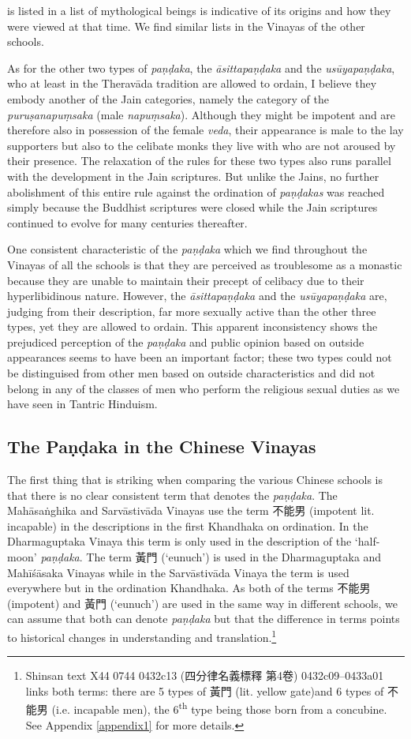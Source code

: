 is listed in a list of mythological beings is indicative of its origins and how they were viewed at that time. We find similar lists in the Vinayas of the other schools.

As for the other two types of {\em paṇḍaka}, the {\em āsittapaṇḍaka} and the {\em usūyapaṇḍaka}, who at least in the Theravāda tradition are allowed to ordain, I believe they embody another of the Jain categories, namely the category of the {\em puruṣanapuṃsaka} (male {\em napuṃsaka}). Although they might be impotent and are therefore also in possession of the female {\em veda}, their appearance is male to the lay supporters but also to the celibate monks they live with who are not aroused by their presence. The relaxation of the rules for these two types also runs parallel with the development in the Jain scriptures. But unlike the Jains, no further abolishment of this entire rule against the ordination of {\em paṇḍakas} was reached simply because the Buddhist scriptures were closed while the Jain scriptures continued to evolve for many centuries thereafter.

One consistent characteristic of the {\em paṇḍaka} which we find throughout the Vinayas of all the schools is that they are perceived as troublesome as a monastic because they are unable to maintain their precept of celibacy due to their hyperlibidinous nature. However, the {\em āsittapaṇḍaka} and the {\em usūyapaṇḍaka} are, judging from their description, far more sexually active than the other three types, yet they are allowed to ordain. This apparent inconsistency shows the prejudiced perception of the {\em paṇḍaka} and public opinion based on outside appearances seems to have been an important factor; these two types could not be distinguised from other men based on outside characteristics and did not belong in any of the classes of men who perform the religious sexual duties as we have seen in Tantric Hinduism.

\subsection{The Paṇḍaka in the Chinese Vinayas}
The first thing that is striking when comparing the various Chinese schools is that there is no clear consistent term that denotes the {\em paṇḍaka}. The Mahāsaṅghika and Sarvāstivāda Vinayas use the term 不能男 (impotent lit. incapable) in the descriptions in the first Khandhaka on ordination. In the Dharmaguptaka Vinaya this term is only used in the description of the `half-moon' {\em paṇḍaka}. The term 黃門 (`eunuch') is used in the Dharmaguptaka and Mahīśāsaka Vinayas while in the Sarvāstivāda Vinaya the term is used everywhere but in the ordination Khandhaka. As both of the terms 不能男 (impotent) and 黃門 (`eunuch') are used in the same way in different schools, we can assume that both can denote {\em paṇḍaka} but that the difference in terms points to historical changes in understanding and translation.\footnote{Shinsan text X44 0744 0432c13 (四分律名義標釋 第4卷) 0432c09–0433a01 links both terms: there are 5 types of 黃門 (lit. yellow gate)and 6 types of 不能男 (i.e. incapable men), the 6\textsuperscript{th} type being those born from a concubine. See Appendix \ref{appendix1} for more details.}

